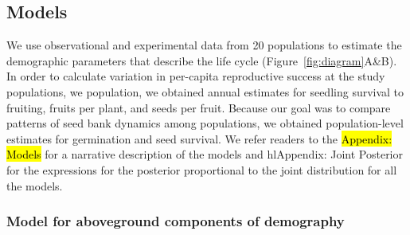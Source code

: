 \documentclass[12pt, oneside, titlepage]{article}   	%
\begin{document}

\subsection{Models}

We use observational and experimental data from 20 populations to estimate the demographic parameters that describe the life cycle (Figure~\ref{fig:diagram}A\&B). In order to calculate variation in per-capita reproductive success at the study populations, we population, we obtained annual estimates for seedling survival to fruiting, fruits per plant, and seeds per fruit. Because our goal was to compare patterns of seed bank dynamics among populations, we obtained population-level estimates for germination and seed survival. We refer readers to the \hl{Appendix: Models} for a narrative description of the models and hl{Appendix: Joint Posterior} for the expressions for the posterior proportional to the joint distribution for all the models. 


\subsubsection{Model for aboveground components of demography}
\end{document}
